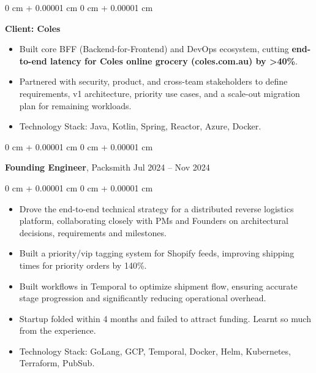 \documentclass[10pt, letterpaper]{article}
\newenvironment{highlights}{
    \begin{itemize}[
        topsep=0.10 cm,
        parsep=0.10 cm,
        partopsep=0pt,
        itemsep=0pt,
        leftmargin=0 cm + 10pt
    ]
}{
    \end{itemize}
} %
\newenvironment{onecolentry}{
    \begin{adjustwidth}{
        0 cm + 0.00001 cm
    }{
        0 cm + 0.00001 cm
    }
}{
    \end{adjustwidth}
} %
\newenvironment{twocolentry}[2][]{
    \onecolentry
    \def\secondColumn{#2}
    \setcolumnwidth{\fill, 4.5 cm}
    \begin{paracol}{2}
}{
    \switchcolumn \raggedleft \secondColumn
    \end{paracol}
    \endonecolentry
} %
\begin{document}
\begin{onecolentry}
            \vspace{0.10 cm}
            \hspace{0.5cm}\textbf{Client: Coles}
            \begin{itemize}[
                topsep=0.10 cm,
                parsep=0.10 cm,
                partopsep=0pt,
                itemsep=0pt,
                leftmargin=0 cm + 10pt + 0.5cm
            ]
                \item Built core BFF (Backend-for-Frontend) and DevOps ecosystem, cutting \textbf{end-to-end latency for Coles online grocery (coles.com.au) by >40\%}.
                \item Partnered with security, product, and cross-team stakeholders to define requirements, v1 architecture, priority use cases, and a scale-out migration plan for remaining workloads.
                \item Technology Stack: Java, Kotlin, Spring, Reactor, Azure, Docker.
            \end{itemize}
        \end{onecolentry}

        \vspace{0.15 cm}
        \begin{twocolentry}{
            Jul 2024 – Nov 2024
        }
            \textbf{Founding Engineer}, Packsmith\end{twocolentry}

        \vspace{0.10 cm}
        \begin{onecolentry}
            \begin{highlights}
                \item Drove the end-to-end technical strategy for a distributed reverse logistics platform, collaborating closely with PMs and Founders on architectural decisions, requirements and milestones.
                \item Built a priority/vip tagging system for Shopify feeds, improving shipping times for priority orders by 140\%.
                \item Built workflows in Temporal to optimize shipment flow, ensuring accurate stage progression and significantly reducing operational overhead.
                \item Startup folded within 4 months and failed to attract funding. Learnt so much from the experience.
                \item Technology Stack: GoLang, GCP, Temporal, Docker, Helm, Kubernetes, Terraform, PubSub.
            \end{highlights}
        \end{onecolentry}
        
\end{document}
